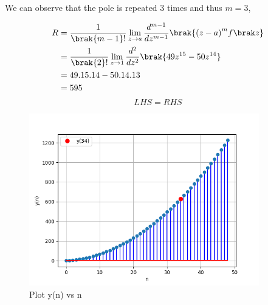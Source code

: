 \documentclass[journal,12pt,onecolumn]{IEEEtran}
\theoremstyle{remark}
\begin{document}
We can observe that the pole is repeated $3$ times and thus $m=3$,

\begin{align}
R&=\frac{1}{\brak {m-1}!}\lim\limits_{z\to a}\frac{d^{m-1}}{dz^{m-1}}\brak {{(z-a)}^{m}f\brak z} \\
&=\frac{1}{\brak {2}!}\lim\limits_{z\to 1}\frac{d^{2}}{dz^{2}}\brak{49z^{15}-50z^{14}}\\
&=49.15.14-50.14.13\\
&=595
\end{align}
\[ LHS = RHS \]




\begin{figure}[h]
    \centering
    \includegraphics[width=100mm]{ncert-maths/10/5/4/4/figs/fig1.png}
    \caption{Plot y(n) vs n}
\end{figure}

\end{document}
